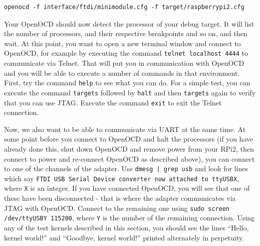 \documentclass[a4paper,11pt,reqno]{amsart}
\begin{document}
\begin{verbatim}
openocd -f interface/ftdi/minimodule.cfg -f target/raspberrypi2.cfg
\end{verbatim}

Your OpenOCD should now detect the processor of your debug target. It will list the number of processors, and their respective breakpoints and so on, and then wait. At this point, you want to open a new terminal window and connect to OpenOCD, for example by executing the command \texttt{telnet localhost 4444} to communicate via Telnet. That will put you in communication with OpenOCD and you will be able to execute a number of commands in that environment. First, try the command \texttt{help} to see what you can do. For a simple test, you can execute the command \texttt{targets} followed by \texttt{halt} and then \texttt{targets} again to verify that you can use JTAG. Execute the command \texttt{exit} to exit the Telnet connection.

Now, we also want to be able to communicate via UART at the same time. At some point before you connect to OpenOCD and halt the processors (if you have already done this, shut down OpenOCD and remove power from your RPi2, then connect to power and re-connect OpenOCD as described above), you can connect to one of the channels of the adapter. Use \texttt{dmesg | grep usb} and look for lines which say \texttt{FTDI USB Serial Device converter now attached to ttyUSBX}, where \texttt{X} is an integer. If you have connected OpenOCD, you will see that one of these have been disconnected - that is where the adapter communicates via JTAG with OpenOCD. Connect to the remaining one using \texttt{sudo screen /dev/ttyUSBY 115200}, where \texttt{Y} is the number of the remaining connection. Using any of the test kernels described in this section, you should see the lines ``Hello, kernel world!'' and ``Goodbye, kernel world!'' printed alternately in perpetuity.

{}

\end{document}
